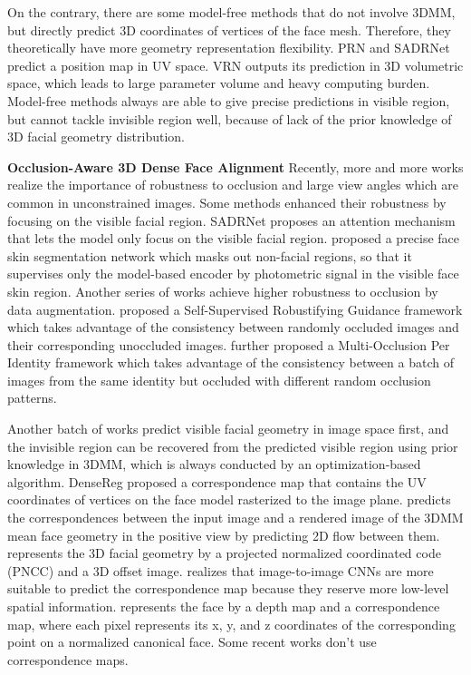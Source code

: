 \documentclass[10pt,twocolumn,letterpaper]{article}
\begin{document}
On the contrary, there are some model-free methods \cite{feng2018prn, ruan2021sadrnet, jackson2017large, zhu2020beyond} that do not involve 3DMM, but directly predict 3D coordinates of vertices of the face mesh. Therefore, they theoretically have more geometry representation flexibility. PRN \cite{feng2018prn} and SADRNet \cite{ruan2021sadrnet} predict a position map in UV space. VRN \cite{jackson2017large} outputs its prediction in 3D volumetric space, which leads to large parameter volume and heavy computing burden. Model-free methods always are able to give precise predictions in visible region, but cannot tackle invisible region well, because of lack of the prior knowledge of 3D facial geometry distribution.

\vspace{0.2cm}
\noindent \textbf{Occlusion-Aware 3D Dense Face Alignment} 
Recently, more and more works \cite{tran2017extreme, ruan2021sadrnet, li2021fit} realize the importance of robustness to occlusion and large view angles which are common in unconstrained images. Some methods enhanced their robustness by focusing on the visible facial region. SADRNet \cite{ruan2021sadrnet} proposes an attention mechanism that lets the model only focus on the visible facial region. \cite{li2021fit} proposed a precise face skin segmentation network which masks out non-facial regions, so that it supervises only the model-based encoder by photometric signal in the visible face skin region. Another series of works achieve higher robustness to occlusion by data augmentation. \cite{tiwari2021self} proposed a Self-Supervised Robustifying Guidance framework which takes advantage of the consistency between randomly occluded images and their corresponding unoccluded images. \cite{tiwari2022occlusion} further proposed a Multi-Occlusion Per Identity framework which takes advantage of the consistency between a batch of images from the same identity but occluded with different random occlusion patterns.

Another batch of works \cite{alp2017densereg, yu2017learning, crispell2017pix2face, zhu2016face, koizumi2020look, sela2017unrestricted, wood20223d, kao2022single} predict visible facial geometry in image space first, and the invisible region can be recovered from the predicted visible region using prior knowledge in 3DMM, which is always conducted by an optimization-based algorithm. DenseReg \cite{alp2017densereg} proposed a correspondence map that contains the UV coordinates of vertices on the face model rasterized to the image plane. \cite{yu2017learning} predicts the correspondences between the input image and a rendered image of the 3DMM mean face geometry in the positive view by predicting 2D flow between them. \cite{crispell2017pix2face} represents the 3D facial geometry by a projected normalized coordinated code (PNCC) \cite{zhu2016face} and a 3D offset image. \cite{koizumi2020look} realizes that image-to-image CNNs are more suitable to predict the correspondence map because they reserve more low-level spatial information. \cite{sela2017unrestricted} represents the face by a depth map and a correspondence map, where each pixel represents its x, y, and z coordinates of the corresponding point on a normalized canonical face.  Some recent works don't use correspondence maps. 
\end{document}
